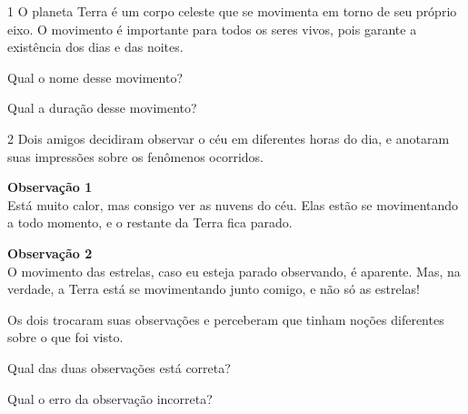 
\num{1} O planeta Terra é um corpo celeste que se movimenta em
torno de seu próprio eixo. O movimento é importante para todos os seres
vivos, pois garante a existência dos dias e das noites.

\begin{escolha}
\item Qual o nome desse movimento?


\item Qual a duração desse movimento?

\end{escolha}

\num{2} Dois amigos decidiram observar o céu em diferentes horas do
dia, e anotaram suas impressões sobre os fenômenos ocorridos.

\begin{mdframed}[linewidth=5pt,linecolor=salmao!20,backgroundcolor=salmao!20,roundcorner=20pt]
\textbf{Observação 1}\\
Está muito calor, mas consigo ver as nuvens
do céu. Elas estão se movimentando a todo momento, e o restante
da Terra fica parado.
\end{mdframed}

\begin{mdframed}[linewidth=5pt,linecolor=azul!20,backgroundcolor=azul!20,roundcorner=20pt]
\textbf{Observação 2}\\
O movimento das estrelas, caso eu esteja
parado observando, é aparente. Mas, na verdade, a Terra está se
movimentando junto comigo, e não só as estrelas!
\end{mdframed}

\noindent{}Os dois trocaram suas observações e perceberam que tinham noções
diferentes sobre o que foi visto.

\begin{escolha}
\item Qual das duas observações está correta?


\item Qual o erro da observação incorreta?

\end{escolha}

